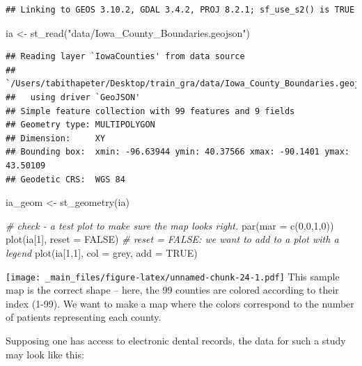 \documentclass[
]{book}
\newenvironment{Shaded}{\begin{snugshade}}{\end{snugshade}}
\newcommand{\AttributeTok}[1]{\textcolor[rgb]{0.77,0.63,0.00}{#1}}
\newcommand{\CommentTok}[1]{\textcolor[rgb]{0.56,0.35,0.01}{\textit{#1}}}
\newcommand{\ConstantTok}[1]{\textcolor[rgb]{0.00,0.00,0.00}{#1}}
\newcommand{\DecValTok}[1]{\textcolor[rgb]{0.00,0.00,0.81}{#1}}
\newcommand{\FunctionTok}[1]{\textcolor[rgb]{0.00,0.00,0.00}{#1}}
\newcommand{\NormalTok}[1]{#1}
\newcommand{\OtherTok}[1]{\textcolor[rgb]{0.56,0.35,0.01}{#1}}
\newcommand{\StringTok}[1]{\textcolor[rgb]{0.31,0.60,0.02}{#1}}
\begin{document}
\begin{verbatim}
## Linking to GEOS 3.10.2, GDAL 3.4.2, PROJ 8.2.1; sf_use_s2() is TRUE
\end{verbatim}

\begin{Shaded}
\begin{Highlighting}[]
\NormalTok{ia }\OtherTok{\textless{}{-}} \FunctionTok{st\_read}\NormalTok{(}\StringTok{"data/Iowa\_County\_Boundaries.geojson"}\NormalTok{)}
\end{Highlighting}
\end{Shaded}

\begin{verbatim}
## Reading layer `IowaCounties' from data source 
##   `/Users/tabithapeter/Desktop/train_gra/data/Iowa_County_Boundaries.geojson' 
##   using driver `GeoJSON'
## Simple feature collection with 99 features and 9 fields
## Geometry type: MULTIPOLYGON
## Dimension:     XY
## Bounding box:  xmin: -96.63944 ymin: 40.37566 xmax: -90.1401 ymax: 43.50109
## Geodetic CRS:  WGS 84
\end{verbatim}

\begin{Shaded}
\begin{Highlighting}[]
\NormalTok{ia\_geom }\OtherTok{\textless{}{-}} \FunctionTok{st\_geometry}\NormalTok{(ia)}


\CommentTok{\# check {-} a test plot to make sure the map looks right. }
\FunctionTok{par}\NormalTok{(}\AttributeTok{mar =} \FunctionTok{c}\NormalTok{(}\DecValTok{0}\NormalTok{,}\DecValTok{0}\NormalTok{,}\DecValTok{1}\NormalTok{,}\DecValTok{0}\NormalTok{))}
\FunctionTok{plot}\NormalTok{(ia[}\DecValTok{1}\NormalTok{], }\AttributeTok{reset =} \ConstantTok{FALSE}\NormalTok{) }\CommentTok{\# reset = FALSE: we want to add to a plot with a legend}
\FunctionTok{plot}\NormalTok{(ia[}\DecValTok{1}\NormalTok{,}\DecValTok{1}\NormalTok{], }\AttributeTok{col =} \StringTok{\textquotesingle{}grey\textquotesingle{}}\NormalTok{, }\AttributeTok{add =} \ConstantTok{TRUE}\NormalTok{)}
\end{Highlighting}
\end{Shaded}

\texttt{[image: \_main\_files/figure-latex/unnamed-chunk-24-1.pdf]}
This sample map is the correct shape -- here, the 99 counties are colored according to their index (1-99). We want to make a map where the colors correspond to the number of patients representing each county.

Supposing one has access to electronic dental records, the data for such a study may look like this:
\end{document}
